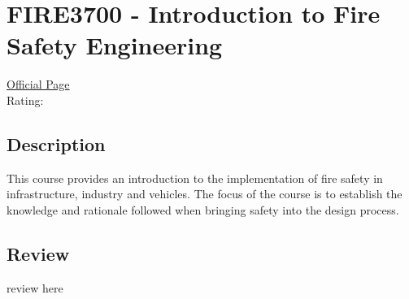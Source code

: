 \hypertarget{FIRE3700}{\section{FIRE3700 - Introduction to Fire Safety Engineering}}

\large
\textcolor{turbo_purple}{\href{https://my.uq.edu.au/programs-courses/course.html?course_code=FIRE3700}{Official Page}} \\
Rating: \cstar\cstar\cstar\cstar\ostar

\normalsize
\subsection*{Description}
This course provides an introduction to the implementation of fire safety in infrastructure, industry and vehicles.
The focus of the course is to establish the knowledge and rationale followed when bringing safety into the design process.

\subsection*{Review}
review here
